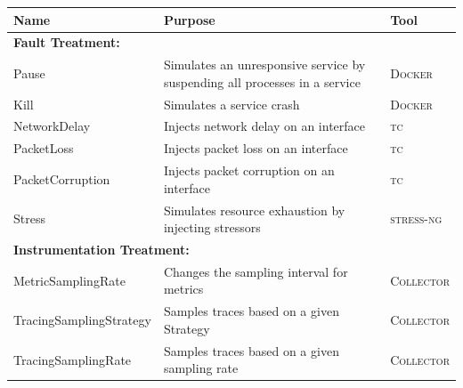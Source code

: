 \setcounter{treatmentsFoodnoteCounter}{\value{footnote}} \centering
\newcommand{\rightIndent}{\hspace{0.2cm}}
\begin{tabular}{lp{}l}
    Name & Purpose & Tool \\ \hline
    \multicolumn{3}{l}{\textbf{Fault Treatment:}} \\
    \rightIndent{}Pause & Simulates an unresponsive service by suspending all processes in a service & \textsc{Docker} \\
    \rightIndent{}Kill & Simulates a service crash & \textsc{Docker} \\
    \rightIndent{}NetworkDelay & Injects network delay on an interface & \textsc{tc\footnotemark} \\
    \rightIndent{}PacketLoss & Injects packet loss on an interface & \textsc{tc} \\
    \rightIndent{}PacketCorruption & Injects packet corruption on an interface & \textsc{tc} \\
    \rightIndent{}Stress & Simulates resource exhaustion by injecting stressors & \textsc{stress-ng\footnotemark} \\ \hline
    \multicolumn{3}{l}{\textbf{Instrumentation Treatment:}} \\
    \rightIndent{}MetricSamplingRate & Changes the sampling interval for metrics & \textsc{Collector} \\
    \rightIndent{}TracingSamplingStrategy & Samples traces based on a given Strategy & \textsc{Collector} \\
    \rightIndent{}TracingSamplingRate & Samples traces based on a given sampling rate & \textsc{Collector}
\end{tabular}
    

